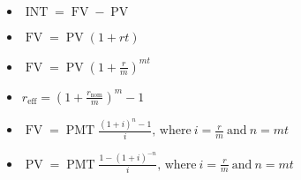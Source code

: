 \documentclass[12pt]{amsart}
\begin{document}
\begin{itemize}
  \newcommand{\INT}{\operatorname{INT}}
  \newcommand{\PV}{\operatorname{PV}}
  \newcommand{\FV}{\operatorname{FV}}
  \newcommand{\PMT}{\operatorname{PMT}}
\item
  $\INT = \FV - \PV$
\item
  $\FV = \PV(1 + rt)$
\item
  $\FV = \PV \left(1 + \frac{r}{m}\right)^{mt}$
\item
  $r_\text{eff} = \displaystyle{\left( 1 + \frac{r_\text{nom}}{m}\right)^m - 1}$
\item
  $\FV = \PMT \displaystyle{\frac{(1 + i)^n - 1}{i}},\, \text{where}\ i = \frac{r}{m}\ \text{and}\ n = mt$
\item
  $\PV = \PMT \displaystyle{\frac{1 - (1 + i)^{-n}}{i}},\, \text{where}\ i = \frac{r}{m}\ \text{and}\ n = mt$
\end{itemize}
\end{document}
